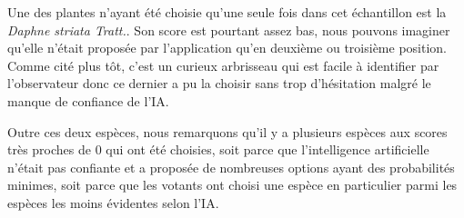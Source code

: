 \documentclass[a4paper,12pt]{article}
\begin{document}
\vspace{0.2cm}

Une des plantes n'ayant été choisie qu'une seule fois dans cet échantillon est la \textit{Daphne striata Tratt.}. Son score est pourtant assez bas, nous pouvons imaginer qu'elle n'était proposée par l'application qu'en deuxième ou troisième position. Comme cité plus tôt, c'est un curieux arbrisseau qui est facile à identifier par l'observateur donc ce dernier a pu la choisir sans trop d'hésitation malgré le manque de confiance de l'IA.

\vspace{0.2cm}

Outre ces deux espèces, nous remarquons qu'il y a plusieurs espèces aux scores très proches de $0$ qui ont été choisies, soit parce que l'intelligence artificielle n'était pas confiante et a proposée de nombreuses options ayant des probabilités minimes, soit parce que les votants ont choisi une espèce en particulier parmi les espèces les moins évidentes selon l'IA.

\end{document}
